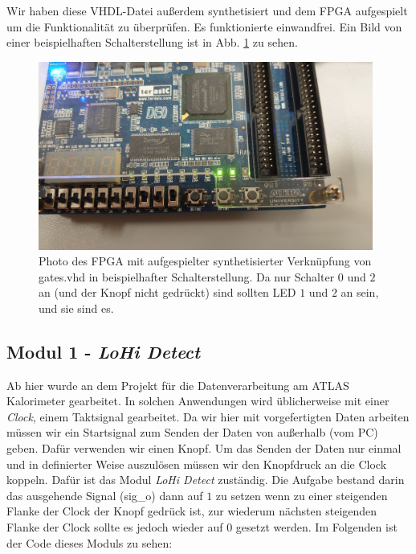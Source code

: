 Wir haben diese VHDL-Datei außerdem synthetisiert und dem FPGA aufgespielt um die Funktionalität zu überprüfen.
Es funktionierte einwandfrei.
Ein Bild von einer beispielhaften Schalterstellung ist in Abb. \ref{photo_gates} zu sehen.

\begin{figure}[ht]
	\centering
    \includegraphics[width=0.98\textwidth]{../Daten/Photo_FPGA_gates.png}
	\caption{Photo des FPGA mit aufgespielter synthetisierter Verknüpfung von gates.vhd in beispielhafter Schalterstellung. Da nur Schalter $0$ und $2$ an (und der Knopf nicht gedrückt) sind sollten LED $1$ und $2$ an sein, und sie sind es.}
	\label{photo_gates}
\end{figure}

\subsection{Modul 1 - \textit{LoHi Detect}}

Ab hier wurde an dem Projekt für die Datenverarbeitung am ATLAS Kalorimeter gearbeitet.
In solchen Anwendungen wird üblicherweise mit einer \textit{Clock}, einem Taktsignal gearbeitet.
Da wir hier mit vorgefertigten Daten arbeiten müssen wir ein Startsignal zum Senden der Daten von außerhalb (vom PC) geben.
Dafür verwenden wir einen Knopf.
Um das Senden der Daten nur einmal und in definierter Weise auszulösen müssen wir den Knopfdruck an die Clock koppeln.
Dafür ist das Modul \textit{LoHi Detect} zuständig.
Die Aufgabe bestand darin das ausgehende Signal (sig\_o) dann auf $1$ zu setzen wenn zu einer steigenden Flanke der Clock der Knopf gedrück ist, zur wiederum nächsten steigenden Flanke der Clock sollte es jedoch wieder auf $0$ gesetzt werden.
Im Folgenden ist der Code dieses Moduls zu sehen:



